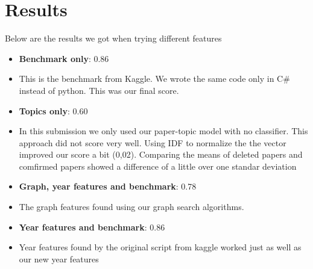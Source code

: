 \section{Results \label{sec:results}}

Below are the results we got when trying different features

\begin{itemize}
	\item[] \textbf{Benchmark only}: 0.86
	\item[] This is the benchmark from Kaggle. We wrote the same code only in C\# instead of python. This was our final score.
	\item[] \textbf{Topics only}: 0.60
	\item[] In this submission we only used our paper-topic model with no classifier. This approach did not score very well. Using IDF to normalize the the vector improved our score a bit (0,02). Comparing the means of deleted papers and comfirmed papers showed a difference of a little over one standar deviation  
	\item[] \textbf{Graph, year features and benchmark}: 0.78
	\item[] The graph features found using our graph search algorithms.
	\item[] \textbf{Year features and  benchmark}: 0.86
	\item[] Year features found by the original script from kaggle worked just as well as our new year features
\end{itemize}



